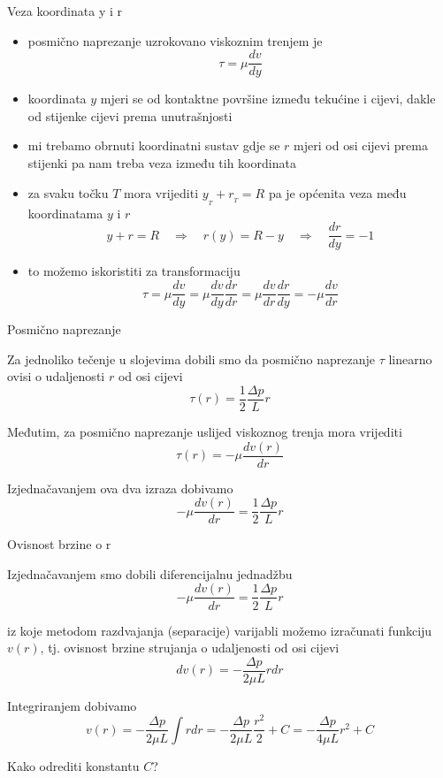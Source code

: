 \documentclass{beamer}
\begin{document}
\begin{frame}{Veza koordinata y i r}

\begin{itemize}
\item posmično naprezanje uzrokovano viskoznim trenjem je
\[
\tau=\mu\frac{dv}{dy}
\]
\item koordinata $y$ mjeri se od kontaktne površine između tekućine i cijevi,
dakle od stijenke cijevi prema unutrašnjosti
\item mi trebamo obrnuti koordinatni sustav gdje se $r$ mjeri od osi cijevi
prema stijenki pa nam treba veza između tih koordinata
\item za svaku točku $T$ mora vrijediti $y_{_{T}}+r_{_{T}}=R$ pa je općenita
veza među koordinatama $y$ i $r$
\[
y+r=R\quad\Rightarrow\quad r(y)=R-y\quad\Rightarrow\quad\frac{dr}{dy}=-1
\]
\item to možemo iskoristiti za transformaciju
\[
\tau=\mu\frac{dv}{dy}=\mu\frac{dv}{dy}\frac{dr}{dr}=\mu\frac{dv}{dr}\frac{dr}{dy}=-\mu\frac{dv}{dr}
\]
\end{itemize}
\end{frame}

\begin{frame}{Posmično naprezanje}

Za jednoliko tečenje u slojevima dobili smo da posmično naprezanje
$\tau$ linearno ovisi o udaljenosti $r$ od osi cijevi 
\[
\tau(r)=\frac{1}{2}\frac{\Delta p}{L}r
\]

Međutim, za posmično naprezanje uslijed viskoznog trenja mora vrijediti
\[
\tau(r)=-\mu\frac{dv(r)}{dr}
\]

Izjednačavanjem ova dva izraza dobivamo
\[
-\mu\frac{dv(r)}{dr}=\frac{1}{2}\frac{\Delta p}{L}r
\]

\end{frame}

\begin{frame}{Ovisnost brzine o r}

Izjednačavanjem smo dobili diferencijalnu jednadžbu 
\[
-\mu\frac{dv(r)}{dr}=\frac{1}{2}\frac{\Delta p}{L}r
\]

iz koje metodom razdvajanja (separacije) varijabli možemo izračunati
funkciju $v(r)$, tj. ovisnost brzine strujanja o udaljenosti od osi
cijevi 
\[
dv(r)=-\frac{\Delta p}{2\mu L}rdr
\]

Integriranjem dobivamo
\[
v(r)=-\frac{\Delta p}{2\mu L}\int rdr=-\frac{\Delta p}{2\mu L}\frac{r^{2}}{2}+C=-\frac{\Delta p}{4\mu L}r^{2}+C
\]

Kako odrediti konstantu $C$?
\end{frame}
\end{document}
